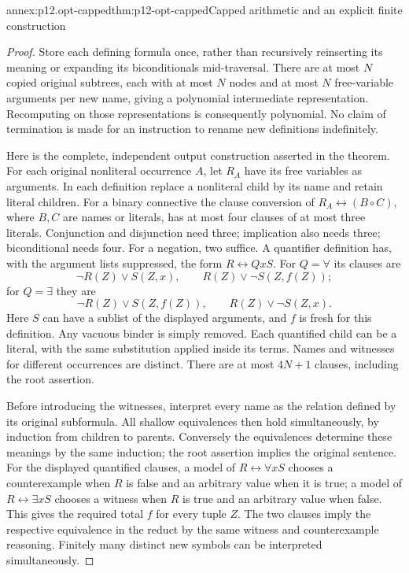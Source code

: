 \begin{annexitem}{annex:p12.opt-capped}{thm:p12-opt-capped}{Capped arithmetic and an explicit finite construction}
\begin{proof}
Store each defining formula once, rather than recursively
reinserting its meaning or expanding its biconditionals mid-traversal.
There are at most \(N\) copied original subtrees, each with at most
\(N\) nodes and at most \(N\) free-variable arguments per new
name, giving a polynomial intermediate representation. Recomputing
on those representations is consequently polynomial. No claim of
termination is made for an instruction to rename new definitions
indefinitely.

Here is the complete, independent output construction asserted in
the theorem. For each original nonliteral occurrence \(A\), let
\(R_A\) have its free variables as arguments. In each definition
replace a nonliteral child by its name and retain literal children.
For a binary connective the clause conversion of
\(R_A\leftrightarrow(B\circ C)\), where \(B,C\) are names or
literals, has at most four clauses of at most three literals.
Conjunction and disjunction need three; implication also needs
three; biconditional needs four. For a negation, two suffice.
A quantifier definition has, with the argument lists suppressed,
the form \(R\leftrightarrow QxS\).
For \(Q=\forall\) its clauses are
\[
 \neg R(Z)\lor S(Z,x),\qquad
 R(Z)\lor\neg S(Z,f(Z));
\]
for \(Q=\exists\) they are
\[
 \neg R(Z)\lor S(Z,f(Z)),\qquad
 R(Z)\lor\neg S(Z,x).
\]
Here \(S\) can have a sublist of the displayed arguments, and
\(f\) is fresh for this definition. Any vacuous binder is simply
removed. Each quantified child can be a literal, with the same
substitution applied inside its terms. Names and witnesses for
different occurrences are distinct. There are at most \(4N+1\)
clauses, including the root assertion.

Before introducing the witnesses, interpret every name as the
relation defined by its original subformula. All shallow
equivalences then hold simultaneously, by induction from children
to parents. Conversely the equivalences determine these meanings
by the same induction; the root assertion implies the original
sentence. For the displayed quantified clauses, a model of
\(R\leftrightarrow\forall xS\) chooses a counterexample when \(R\)
is false and an arbitrary value when it is true; a model of
\(R\leftrightarrow\exists xS\) chooses a witness when \(R\) is
true and an arbitrary value when false. This gives the required
total \(f\) for every tuple \(Z\). The two clauses imply the
respective equivalence in the reduct by the same witness and
counterexample reasoning. Finitely many distinct new symbols can
be interpreted simultaneously.


\end{proof}
\end{annexitem}
